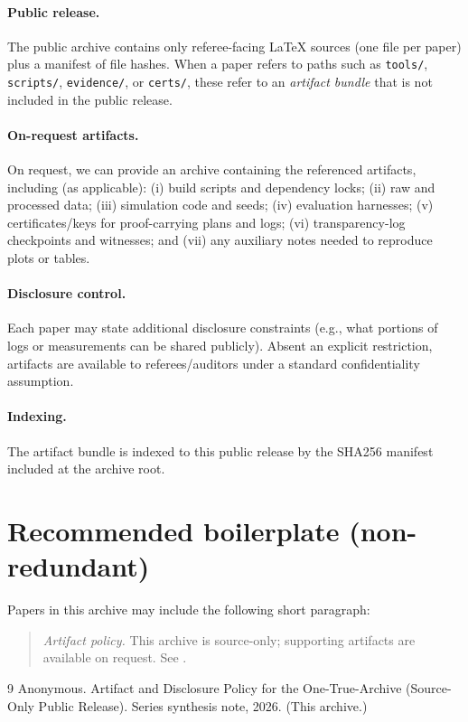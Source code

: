 \documentclass[11pt]{article}
\begin{document}
\paragraph{Public release.}
The public archive contains only referee-facing \LaTeX{} sources (one file per paper) plus a manifest of file hashes.
When a paper refers to paths such as \texttt{tools/}, \texttt{scripts/}, \texttt{evidence/}, or \texttt{certs/}, these refer to an \emph{artifact bundle}
that is not included in the public release.

\paragraph{On-request artifacts.}
On request, we can provide an archive containing the referenced artifacts, including (as applicable):
(i) build scripts and dependency locks;
(ii) raw and processed data;
(iii) simulation code and seeds;
(iv) evaluation harnesses;
(v) certificates/keys for proof-carrying plans and logs;
(vi) transparency-log checkpoints and witnesses; and
(vii) any auxiliary notes needed to reproduce plots or tables.

\paragraph{Disclosure control.}
Each paper may state additional disclosure constraints (e.g., what portions of logs or measurements can be shared publicly).
Absent an explicit restriction, artifacts are available to referees/auditors under a standard confidentiality assumption.

\paragraph{Indexing.}
The artifact bundle is indexed to this public release by the SHA256 manifest included at the archive root.

\section{Recommended boilerplate (non-redundant)}
Papers in this archive may include the following short paragraph:
\begin{quote}
\emph{Artifact policy.} This archive is source-only; supporting artifacts are available on request. See \cite{series:artifactpolicy}.
\end{quote}

\begin{thebibliography}{9}
Anonymous.
\newblock Artifact and Disclosure Policy for the One-True-Archive (Source-Only Public Release).
\newblock Series synthesis note, 2026. (This archive.)
\end{thebibliography}
\end{document}
